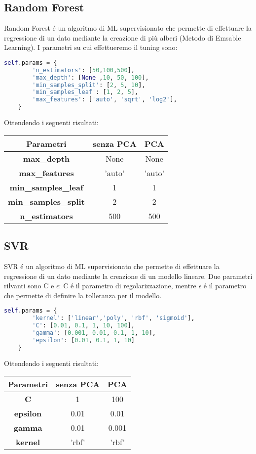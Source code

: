 \documentclass[../../Report.tex]{subfiles}
\begin{document}
\subsection{Random Forest}
Random Forest é un algoritmo di ML supervisionato che permette di effettuare la regressione di un dato mediante la creazione di più alberi (Metodo di Emsable Learning).
I parametri su cui effettueremo il tuning sono:
\begin{lstlisting}[language=Python]
    self.params = {
        'n_estimators': [50,100,500],
        'max_depth': [None ,10, 50, 100],
        'min_samples_split': [2, 5, 10],
        'min_samples_leaf': [1, 2, 5],
        'max_features': ['auto', 'sqrt', 'log2'],
    }
\end{lstlisting}
Ottendendo i seguenti risultati:
\begin{table}[h]
    \centering
    \begin{tabular}{|c|c|c|}
    \hline
\textbf{Parametri} & \textbf{senza PCA} & \textbf{PCA} \\ \hline
\textbf{max\_depth}& None & None\\
\textbf{max\_features}& 'auto' &  'auto' \\
\textbf{min\_samples\_leaf}& 1 & 1\\
\textbf{min\_samples\_split}& 2 & 2\\
\textbf{n\_estimators}& 500 & 500\\
\hline

\end{tabular}
\end{table}

\subsection{SVR}
SVR é un algoritmo di ML supervisionato che permette di effettuare la regressione di un dato mediante la creazione di un modello lineare.
Due parametri rilvanti sono C e $\epsilon$: C é il parametro di regolarizzazione, mentre $\epsilon$ é il parametro che permette di definire la tolleranza per il modello.
\begin{lstlisting}[language=Python]
    self.params = {
        'kernel': ['linear','poly', 'rbf', 'sigmoid'],
        'C': [0.01, 0.1, 1, 10, 100],
        'gamma': [0.001, 0.01, 0.1, 1, 10],
        'epsilon': [0.01, 0.1, 1, 10]
    }
\end{lstlisting}
Ottendendo i seguenti risultati:
\begin{table}[h]
    \centering
    \begin{tabular}{|c|c|c|}
    \hline
\textbf{Parametri} & \textbf{senza PCA} & \textbf{PCA} \\ \hline
\textbf{C}& 1 & 100\\
\textbf{epsilon}& 0.01 &  0.01 \\
\textbf{gamma}& 0.01 & 0.001\\
\textbf{kernel}& 'rbf' &  'rbf'\\
\hline
\end{tabular}
\end{table}
\end{document}
